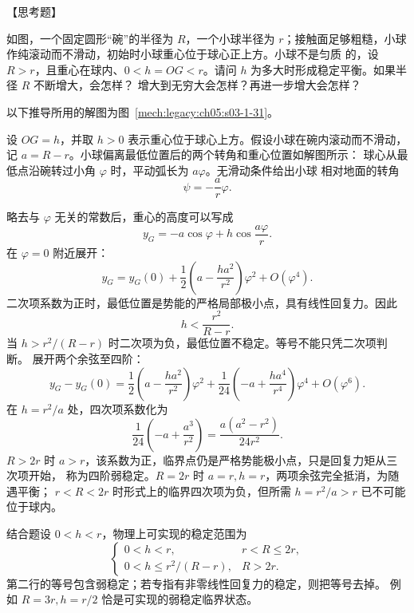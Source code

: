 {\begin{origexamplebox}{【思考题】}\label{ch05:ex:s03-1-31}
\begin{minipage}[t]{0.62\linewidth}
如图，一个固定圆形“碗”的半径为 $R$，一个小球半径为 $r$；接触面足够粗糙，小球
作纯滚动而不滑动，初始时小球重心位于球心正上方。小球不是匀质
的，设 $R>r$，且重心在球内、$0<h=OG<r$。请问 $h$ 为多大时形成稳定平衡。如果半径 $R$ 不断增大，会怎样？
增大到无穷大会怎样？再进一步增大会怎样？
\end{minipage}\hfill
\begin{minipage}[t]{0.34\linewidth}
\vspace{0pt}\centering
\resizebox{\linewidth}{!}{\faithfulExOneThirtyOne}
\end{minipage}
\end{origexamplebox}

\begin{xesolution}
以下推导所用的解图为图~\ref{mech:legacy:ch05:s03-1-31}。

设 $OG=h$，并取 $h>0$ 表示重心位于球心上方。假设小球在碗内滚动而不滑动，记
$a=R-r$。小球偏离最低位置后的两个转角和重心位置如解图所示：
\soldiagOneThirtyOne
球心从最低点沿碗转过小角 $\varphi$ 时，平动弧长为 $a\varphi$。无滑动条件给出小球
相对地面的转角
\[
  \psi=-\frac{a}{r}\varphi.
\]

略去与 $\varphi$ 无关的常数后，重心的高度可以写成
\[
  y_G=-a\cos\varphi+h\cos\frac{a\varphi}{r}.
\]
在 $\varphi=0$ 附近展开：
\[
  y_G=y_G(0)+\frac12\left(a-\frac{ha^2}{r^2}\right)\varphi^2
  +O(\varphi^4).
\]
二次项系数为正时，最低位置是势能的严格局部极小点，具有线性回复力。因此
\[
  \boxed{h<\frac{r^2}{R-r}}.
\]
当 $h>r^2/(R-r)$ 时二次项为负，最低位置不稳定。等号不能只凭二次项判断。
展开两个余弦至四阶：
\[
 y_G-y_G(0)=\frac12\left(a-\frac{ha^2}{r^2}\right)\varphi^2
 +\frac1{24}\left(-a+\frac{ha^4}{r^4}\right)\varphi^4+O(\varphi^6).
\]
在 $h=r^2/a$ 处，四次项系数化为
\[
 \frac1{24}\left(-a+\frac{a^3}{r^2}\right)
 =\frac{a(a^2-r^2)}{24r^2}.
\]
$R>2r$ 时 $a>r$，该系数为正，临界点仍是严格势能极小点，只是回复力矩从三次项开始，
称为四阶弱稳定。$R=2r$ 时 $a=r,h=r$，两项余弦完全抵消，为随遇平衡；
$r<R<2r$ 时形式上的临界四次项为负，但所需 $h=r^2/a>r$ 已不可能位于球内。

结合题设 $0<h<r$，物理上可实现的稳定范围为
\[
 \boxed{\begin{cases}
  0<h<r, & r<R\le2r,\\
  0<h\le r^2/(R-r), & R>2r.
 \end{cases}}
\]
第二行的等号包含弱稳定；若专指有非零线性回复力的稳定，则把等号去掉。
例如 $R=3r,h=r/2$ 恰是可实现的弱稳定临界状态。


\end{xesolution}}
